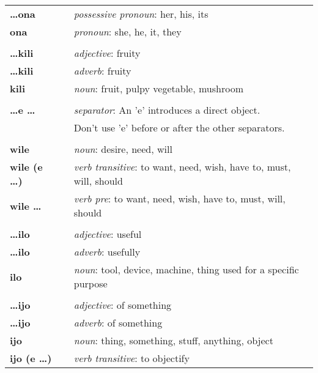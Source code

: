 \begin{supertabular}{p{2,5cm}|ll}
\textbf{\dots ona} && \textit{possessive pronoun}: her, his, its \\  %
\textbf{ona} && \textit{pronoun}: she, he, it, they \\ %
 && \\ %
\textbf{\dots kili} && \textit{adjective}: fruity \\ %
\textbf{\dots kili} && \textit{adverb}: fruity \\ %
\textbf{kili} && \textit{noun}: fruit, pulpy vegetable, mushroom \\ %
 && \\ %
\textbf{\dots e \dots} && \textit{separator}: An 'e' introduces a direct object. \\ && Don't use 'e' before or after the other separators. \\ %
 && \\ %
\textbf{wile} && \textit{noun}: desire, need, will \\ %
\textbf{wile (e \dots)} && \textit{verb transitive}: to want, need, wish, have to, must, will, should \\ %
\textbf{wile \dots} && \textit{verb pre}: to want, need, wish, have to, must, will, should \\ %
 && \\ %
\textbf{\dots ilo} && \textit{adjective}: useful \\ %
\textbf{\dots ilo} && \textit{adverb}: usefully \\ %
\textbf{ilo} && \textit{noun}: tool, device, machine, thing used for a specific purpose \\ %
 && \\ %
\textbf{\dots ijo} && \textit{adjective}: of something \\ %
\textbf{\dots ijo} && \textit{adverb}: of something \\ %
\textbf{ijo} && \textit{noun}: thing, something, stuff, anything, object \\ %
\textbf{ijo (e \dots)} && \textit{verb transitive}: to objectify \\ %

\end{supertabular}
